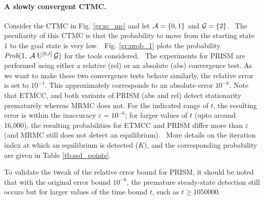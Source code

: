 \documentclass[times, 10pt,twocolumn]{article}
\begin{document}
	\paragraph{A slowly convergent CTMC. \label{ss:slow_conv}}
		Consider the CTMC in Fig. \ref{gr:sc_mc} and let $\mathcal{A} = \{0,1\}$ and $\mathcal{G} = \{2\}$.  The peculiarity of this CTMC is that the probability to move from the starting state $1$ to the goal state is very low.  Fig. \ref{gr:prob_1} plots the probability $\mbox{\it Prob}(1, \: \mathcal{A} \: \mathrm{U}^{[0,t]} \: \mathcal{G} )$ for the tools considered.  The experiments for PRISM are performed using either a relative (rel) or an absolute (abs) convergence test. As we want to make these two convergence tests behave similarly, the relative error is set to $10^{-1}$. This approximately corresponds to an absolute error $10^{-6}$. Note that ETMCC, and both variants of PRISM (abs and rel) detect stationarity prematurely whereas MRMC does not. For the indicated range of $t$, the resulting error is within the inaccuracy $\varepsilon = 10^{{-}6}$; for larger values of $t$ (upto around 16,000), the resulting probabilities for ETMCC and PRISM differ more than $\varepsilon$ (and MRMC still does not detect an equilibrium).  More details on the iteration index at which an equilibrium is detected ($K$), and the corresponding probability are given in Table \ref{tb:ssd_points}.
		
		To validate the tweak of the relative error bound for PRISM, it should be noted that with the original error bound $10^{-6}$, the premature steady-state detection still occurs but for larger values of the time bound $t$, such as $t \geq 1050000$.
		
\end{document}

